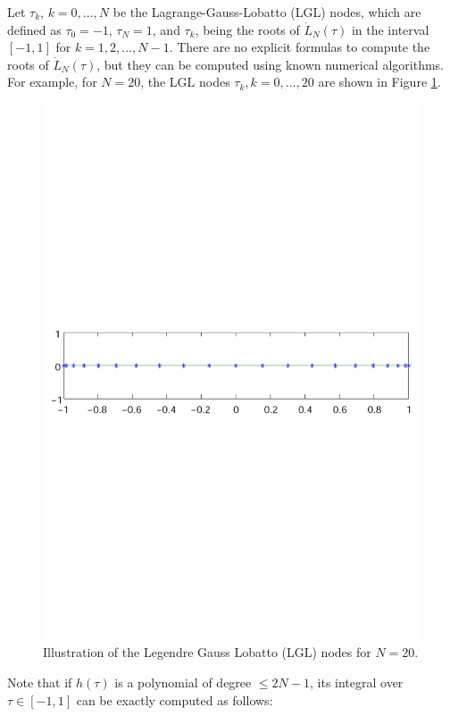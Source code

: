 \documentclass[a4paper,11pt]{report}    %
\begin{document}
 Let $\tau_k$, $k=0,\ldots,N$ be the Lagrange-Gauss-Lobatto (LGL) nodes, which are defined
 as $\tau_0 = -1$, $\tau_N = 1$, and $\tau_k$, being the roots of $\dot L_N(\tau)$ in the
interval $[-1, 1]$ for $k = 1,2,\ldots, N - 1$. There are no explicit formulas to compute the roots of $\dot L_N(\tau)$, but they can be computed
using known numerical algorithms. For example, for $N=20$, the LGL nodes $\tau_k, k=0,\ldots,20$ are shown
in Figure \ref{fig:lglnodes}. 


\begin{figure}[htbp] 
 \centerline{\includegraphics[width=14cm]{lglnodesplot}}
\caption{Illustration of the Legendre Gauss Lobatto (LGL) nodes for $N=20$.}
\label{fig:lglnodes}
\end{figure}



        Note that if $h(\tau)$ is a polynomial of degree $\le 2N-1$, its integral over
$\tau \in [-1,1]$ can be exactly computed as follows:
\end{document}
